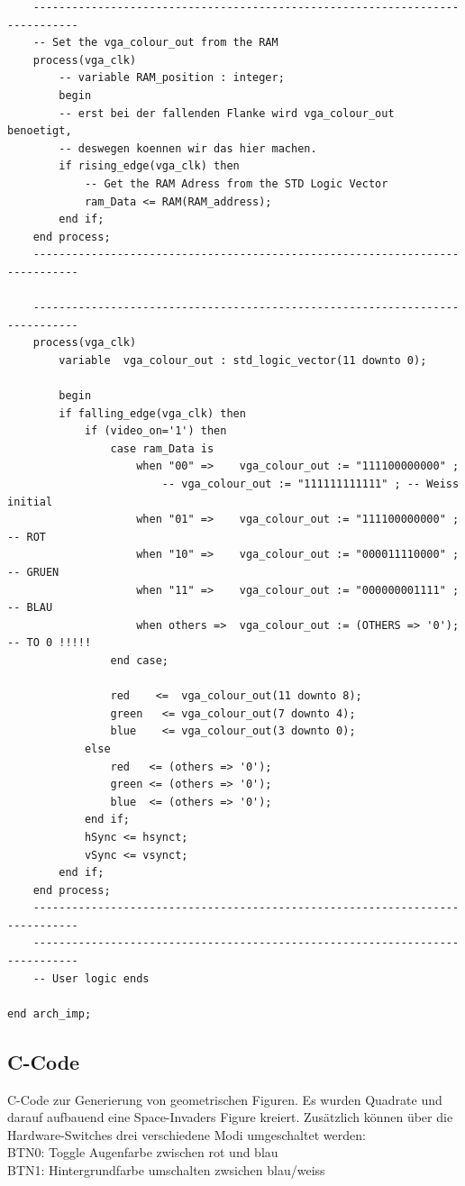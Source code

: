 \begin{verbatim}
    -----------------------------------------------------------------------------
    -- Set the vga_colour_out from the RAM
    process(vga_clk)
        -- variable RAM_position : integer;
        begin
        -- erst bei der fallenden Flanke wird vga_colour_out benoetigt, 
        -- deswegen koennen wir das hier machen.
        if rising_edge(vga_clk) then
            -- Get the RAM Adress from the STD Logic Vector
            ram_Data <= RAM(RAM_address);
        end if;
    end process;
    -----------------------------------------------------------------------------
    
    -----------------------------------------------------------------------------
    process(vga_clk)
        variable  vga_colour_out : std_logic_vector(11 downto 0);
        
        begin
        if falling_edge(vga_clk) then
            if (video_on='1') then
                case ram_Data is     
                    when "00" =>    vga_colour_out := "111100000000" ; 
                        -- vga_colour_out := "111111111111" ; -- Weiss initial
                    when "01" =>    vga_colour_out := "111100000000" ; -- ROT 
                    when "10" =>    vga_colour_out := "000011110000" ; -- GRUEN
                    when "11" =>    vga_colour_out := "000000001111" ; -- BLAU
                    when others =>  vga_colour_out := (OTHERS => '0'); -- TO 0 !!!!!
                end case;
             
                red    <=  vga_colour_out(11 downto 8);
                green   <= vga_colour_out(7 downto 4);
                blue    <= vga_colour_out(3 downto 0);
            else
                red   <= (others => '0');
                green <= (others => '0');
                blue  <= (others => '0');
            end if;
            hSync <= hsynct;
            vSync <= vsynct;
        end if;
    end process; 
    -----------------------------------------------------------------------------
    -----------------------------------------------------------------------------
	-- User logic ends

end arch_imp;
\end{verbatim}

\subsection{C-Code}
C-Code zur Generierung von geometrischen Figuren. Es wurden Quadrate und darauf aufbauend eine Space-Invaders 
Figure kreiert. Zusätzlich können über die Hardware-Switches drei verschiedene Modi umgeschaltet werden:\\
BTN0: Toggle Augenfarbe zwischen rot und blau\\
BTN1: Hintergrundfarbe umschalten zwsichen blau/weiss\\

